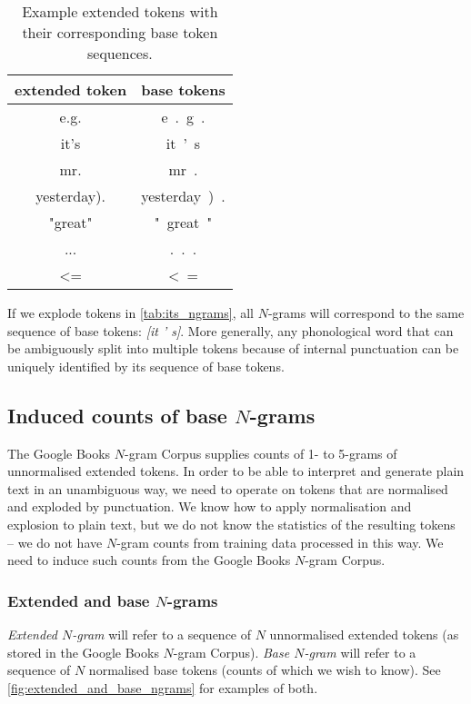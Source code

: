 \documentclass[draft]{IIBproject}
\DeclareRobustCommand{\ngram}[1]{\emph{[#1]}}
\begin{document}
\begin{table}[h]
	\centering
	\begin{tabular}{c | c}
	extended token & base tokens \\
	\hline
	e.g. & e\ .\ g\ . \\
	it's & it\ '\ s \\
	mr. & mr\ . \\
	yesterday). & yesterday\ )\ . \\
	"great" & "\ great\ " \\
	... & .\ .\ . \\
	\textless= & \textless\ =
	\end{tabular}
	\caption{\label{tab:extended_tokens}Example extended tokens with their corresponding base token sequences.}
\end{table}

If we explode tokens in \cref{tab:its_ngrams}, all $N$-grams will correspond to the same sequence of base tokens: \ngram{it ' s}. More generally, any phonological word that can be ambiguously split into multiple tokens because of internal punctuation can be uniquely identified by its sequence of base tokens.

\FloatBarrier
\subsection{Induced counts of base $N$-grams}

The Google Books $N$-gram Corpus supplies counts of 1- to 5-grams of unnormalised extended tokens. In order to be able to interpret and generate plain text in an unambiguous way, we need to operate on tokens that are normalised and exploded by punctuation. We know how to apply normalisation and explosion to plain text, but we do not know the statistics of the resulting tokens -- we do not have $N$-gram counts from training data processed in this way. We need to induce such counts from the Google Books $N$-gram Corpus.

\subsubsection{Extended and base $N$-grams}

\emph{Extended $N$-gram} will refer to a sequence of $N$ unnormalised extended tokens (as stored in the Google Books $N$-gram Corpus). \emph{Base $N$-gram} will refer to a sequence of $N$ normalised base tokens (counts of which we wish to know). See \cref{fig:extended_and_base_ngrams} for examples of both.
\end{document}
